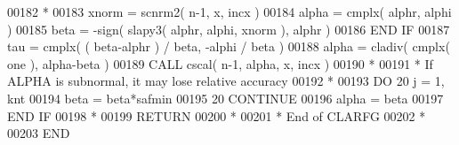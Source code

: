 \begin{DoxyCode}
00182 \textcolor{comment}{*}
00183             xnorm = scnrm2( n-1, x, incx )
00184             alpha = cmplx( alphr, alphi )
00185             beta = -sign( slapy3( alphr, alphi, xnorm ), alphr )
00186 \textcolor{keywordflow}{         END IF}
00187          tau = cmplx( ( beta-alphr ) / beta, -alphi / beta )
00188          alpha = cladiv( cmplx( one ), alpha-beta )
00189          \textcolor{keyword}{CALL }cscal( n-1, alpha, x, incx )
00190 \textcolor{comment}{*}
00191 \textcolor{comment}{*        If ALPHA is subnormal, it may lose relative accuracy}
00192 \textcolor{comment}{*}
00193          \textcolor{keywordflow}{DO} 20 j = 1, knt
00194             beta = beta*safmin
00195  20      \textcolor{keywordflow}{CONTINUE}
00196          alpha = beta
00197 \textcolor{keywordflow}{      END IF}
00198 \textcolor{comment}{*}
00199       \textcolor{keywordflow}{RETURN}
00200 \textcolor{comment}{*}
00201 \textcolor{comment}{*     End of CLARFG}
00202 \textcolor{comment}{*}
00203 \textcolor{keyword}{      END}
\end{DoxyCode}
